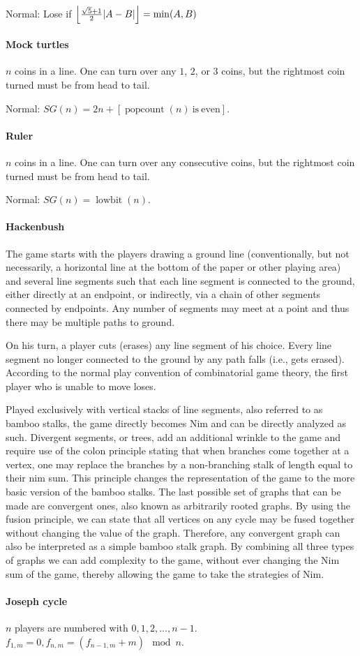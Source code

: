 Normal: Lose if $\floor*{\frac{\sqrt{5}+1}{2}|A-B|}=\min(A,B)$

\paragraph{Mock turtles}
$n$ coins in a line. One can turn over any $1$, $2$, or $3$ coins, but the rightmost coin turned must be from head to tail.

Normal: $SG(n)=2n+[\operatorname{popcount}(n)\mathrm{\ is\ even}]$.

\paragraph{Ruler}
$n$ coins in a line. One can turn over any consecutive coins, but the rightmost coin turned must be from head to tail.

Normal: $SG(n)=\operatorname{lowbit}(n)$.

\paragraph{Hackenbush}
The game starts with the players drawing a ground line (conventionally, but not necessarily, a horizontal line at the bottom of the paper or other playing area) and several line segments such that each line segment is connected to the ground, either directly at an endpoint, or indirectly, via a chain of other segments connected by endpoints. Any number of segments may meet at a point and thus there may be multiple paths to ground.

On his turn, a player cuts (erases) any line segment of his choice. Every line segment no longer connected to the ground by any path falls (i.e., gets erased). According to the normal play convention of combinatorial game theory, the first player who is unable to move loses.

Played exclusively with vertical stacks of line segments, also referred to as bamboo stalks, the game directly becomes Nim and can be directly analyzed as such. Divergent segments, or trees, add an additional wrinkle to the game and require use of the colon principle stating that when branches come together at a vertex, one may replace the branches by a non-branching stalk of length equal to their nim sum. This principle changes the representation of the game to the more basic version of the bamboo stalks. The last possible set of graphs that can be made are convergent ones, also known as arbitrarily rooted graphs. By using the fusion principle, we can state that all vertices on any cycle may be fused together without changing the value of the graph. Therefore, any convergent graph can also be interpreted as a simple bamboo stalk graph. By combining all three types of graphs we can add complexity to the game, without ever changing the Nim sum of the game, thereby allowing the game to take the strategies of Nim.

\paragraph{Joseph cycle}
$n$ players are numbered with $0,1,2,...,n-1$. $f_{1,m}=0,f_{n,m}=(f_{n-1,m}+m)\mod n$.
